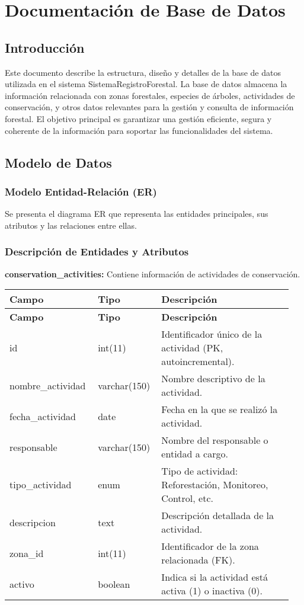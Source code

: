 \chapter{Documentación de Base de Datos}
\label{cap:basedatos}

\section{Introducción}
Este documento describe la estructura, diseño y detalles de la base de datos utilizada en el sistema SistemaRegistroForestal. La base de datos almacena la información relacionada con zonas forestales, especies de árboles, actividades de conservación, y otros datos relevantes para la gestión y consulta de información forestal.
El objetivo principal es garantizar una gestión eficiente, segura y coherente de la información para soportar las funcionalidades del sistema.

\section{Modelo de Datos}
\subsection{Modelo Entidad-Relación (ER)}
Se presenta el diagrama ER que representa las entidades principales, sus atributos y las relaciones entre ellas.

\subsection{Descripción de Entidades y Atributos}

\textbf{conservation\_activities:} Contiene información de actividades de conservación.
\begin{longtable}{|p{0.3\linewidth}|p{0.2\linewidth}|p{0.45\linewidth}|}
\hline \textbf{Campo} & \textbf{Tipo} & \textbf{Descripción} \\ \hline
\endfirsthead
\hline \textbf{Campo} & \textbf{Tipo} & \textbf{Descripción} \\ \hline
\endhead
\hline
\endfoot
\hline
\endlastfoot
id & int(11) & Identificador único de la actividad (PK, autoincremental). \\ \hline
nombre\_actividad & varchar(150) & Nombre descriptivo de la actividad. \\ \hline
fecha\_actividad & date & Fecha en la que se realizó la actividad. \\ \hline
responsable & varchar(150) & Nombre del responsable o entidad a cargo. \\ \hline
tipo\_actividad & enum & Tipo de actividad: Reforestación, Monitoreo, Control, etc. \\ \hline
descripcion & text & Descripción detallada de la actividad. \\ \hline
zona\_id & int(11) & Identificador de la zona relacionada (FK). \\ \hline
activo & boolean & Indica si la actividad está activa (1) o inactiva (0). \\ \hline
\end{longtable}

